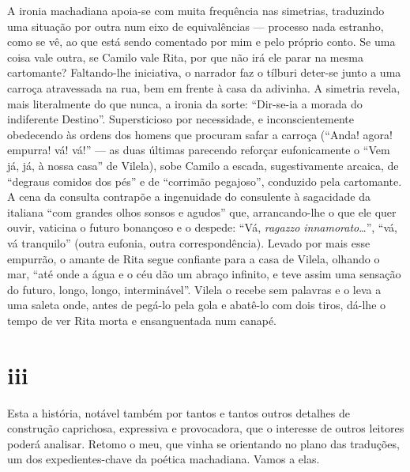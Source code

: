 A ironia machadiana apoia-se com muita frequência nas simetrias,
traduzindo uma situação por outra num eixo de equivalências --- processo
nada estranho, como se vê, ao que está sendo comentado por mim e pelo
próprio conto. Se uma coisa vale outra, se Camilo vale Rita, por que não
irá ele parar na mesma cartomante? Faltando-lhe iniciativa, o narrador
faz o tílburi deter-se junto a uma carroça atravessada na rua, bem em
frente à casa da adivinha. A simetria revela, mais literalmente do que
nunca, a ironia da sorte: ``Dir-se-ia a morada do indiferente Destino''.
Supersticioso por necessidade, e inconscientemente obedecendo às ordens
dos homens que procuram safar a carroça (``Anda! agora! empurra! vá!
vá!'' --- as duas últimas parecendo reforçar eufonicamente o ``Vem já,
já, à nossa casa'' de Vilela), sobe Camilo a escada, sugestivamente
arcaica, de ``degraus comidos dos pés'' e de ``corrimão pegajoso'',
conduzido pela cartomante. A cena da consulta contrapõe a ingenuidade do
consulente à sagacidade da italiana ``com grandes olhos sonsos e
agudos'' que, arrancando-lhe o que ele quer ouvir, vaticina o futuro
bonançoso e o despede: ``Vá, \emph{ragazzo innamorato}\ldots{}'', ``vá,
vá tranquilo'' (outra eufonia, outra correspondência). Levado por mais
esse empurrão, o amante de Rita segue confiante para a casa de Vilela,
olhando o mar, ``até onde a água e o céu dão um abraço infinito, e teve
assim uma sensação do futuro, longo, longo, interminável''. Vilela o
recebe sem palavras e o leva a uma saleta onde, antes de pegá-lo pela
gola e abatê-lo com dois tiros, dá-lhe o tempo de ver Rita morta e
ensanguentada num canapé.

\section{iii}

Esta a história, notável também por tantos e tantos outros detalhes de
construção caprichosa, expressiva e provocadora, que o interesse de
outros leitores poderá analisar. Retomo o meu, que vinha se orientando
no plano das traduções, um dos expedientes-chave da poética machadiana.
Vamos a elas.

